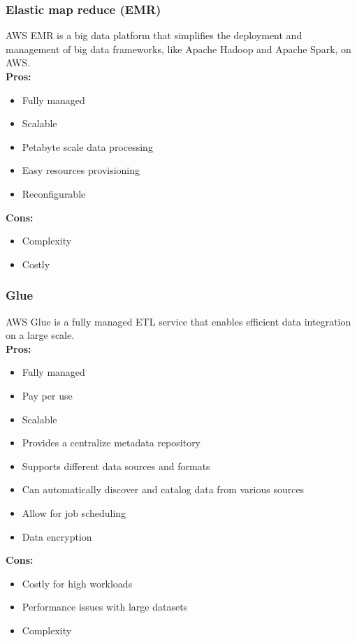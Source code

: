         \subsubsection{Elastic map reduce (EMR)}
        \label{aws:emr}
        AWS EMR is a big data platform that simplifies the deployment and management of big data frameworks, like Apache Hadoop and Apache Spark, on AWS.\\
        \textbf{Pros:}
        \begin{itemize}
            \item Fully managed
            \item Scalable
            \item Petabyte scale data processing
            \item Easy resources provisioning
            \item Reconfigurable
        \end{itemize}
        \textbf{Cons:}
        \begin{itemize}
            \item Complexity
            \item Costly
        \end{itemize}

        \subsubsection{Glue}
        \label{aws:glue}
        AWS Glue is a fully managed ETL service that enables efficient data integration on a large scale.\\
        \textbf{Pros:}
        \begin{itemize}
            \item Fully managed
            \item Pay per use
            \item Scalable
            \item Provides a centralize metadata repository
            \item Supports different data sources and formats
            \item Can automatically discover and catalog data from various sources
            \item Allow for job scheduling
            \item Data encryption
        \end{itemize}
        \textbf{Cons:}
        \begin{itemize}
            \item Costly for high workloads
            \item Performance issues with large datasets
            \item Complexity
        \end{itemize}

